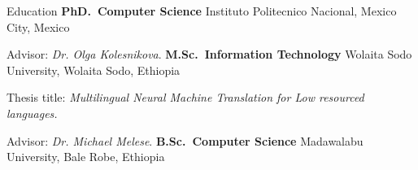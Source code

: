 \begin{rubric}{Education}
%
\entry*[2022 -- Ongoing]%
	\textbf{PhD.~Computer Science} Instituto Politecnico Nacional, Mexico City, Mexico \par
	Advisor: \emph{Dr. Olga Kolesnikova}.
\entry*[2019 -- 2021]%
	\textbf{M.Sc.~Information Technology} Wolaita Sodo University, Wolaita Sodo, Ethiopia \par
	Thesis title: \emph{Multilingual Neural Machine Translation for Low resourced languages.}\par
	Advisor: \emph{Dr. Michael Melese}.
\entry*[2011 -- 2015]%
	\textbf{B.Sc.~Computer Science} Madawalabu University, Bale Robe, Ethiopia\par 
\end{rubric}